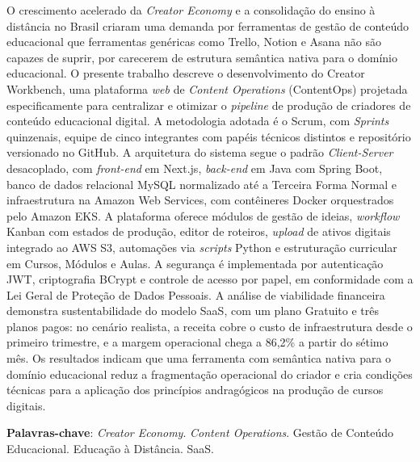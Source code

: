 \begin{resumo}
O crescimento acelerado da \textit{Creator Economy} e a consolidação do ensino à distância 
no Brasil criaram uma demanda por ferramentas de gestão de conteúdo educacional 
que ferramentas genéricas como Trello, Notion e Asana não são capazes de suprir, 
por carecerem de estrutura semântica nativa para o domínio educacional. O presente 
trabalho descreve o desenvolvimento do Creator Workbench, uma plataforma \textit{web} de 
\textit{Content Operations} (ContentOps) projetada especificamente para centralizar e 
otimizar o \textit{pipeline} de produção de criadores de conteúdo educacional digital. A 
metodologia adotada é o Scrum, com \textit{Sprints} quinzenais, equipe de cinco integrantes 
com papéis técnicos distintos e repositório versionado no GitHub. A arquitetura do 
sistema segue o padrão \textit{Client-Server} desacoplado, com \textit{front-end} em Next.js, 
\textit{back-end} em Java com Spring Boot, banco de dados relacional MySQL normalizado até 
a Terceira Forma Normal e infraestrutura na Amazon Web Services, com contêineres
Docker orquestrados pelo Amazon EKS. A 
plataforma oferece módulos de gestão de ideias, \textit{workflow} Kanban com estados de 
produção, editor de roteiros, \textit{upload} de ativos digitais integrado ao AWS S3, 
automações via \textit{scripts} Python e estruturação curricular em Cursos, Módulos e Aulas. 
A segurança é implementada por autenticação JWT, criptografia BCrypt e controle de
acesso por papel, em conformidade com a Lei Geral de Proteção de Dados Pessoais. A análise 
de viabilidade financeira demonstra sustentabilidade do modelo SaaS, com um plano Gratuito
e três planos pagos: no cenário realista, a receita cobre o custo de infraestrutura
desde o primeiro trimestre, e a margem operacional chega a 86,2\% a partir do sétimo mês. Os resultados indicam que uma ferramenta com semântica 
nativa para o domínio educacional reduz a fragmentação operacional do criador e 
cria condições técnicas para a aplicação dos princípios andragógicos na produção 
de cursos digitais.

\vspace{\onelineskip}
\noindent
\textbf{Palavras-chave}: \textit{Creator Economy}. \textit{Content Operations}. Gestão de Conteúdo Educacional. Educação à Distância. SaaS.
\end{resumo}